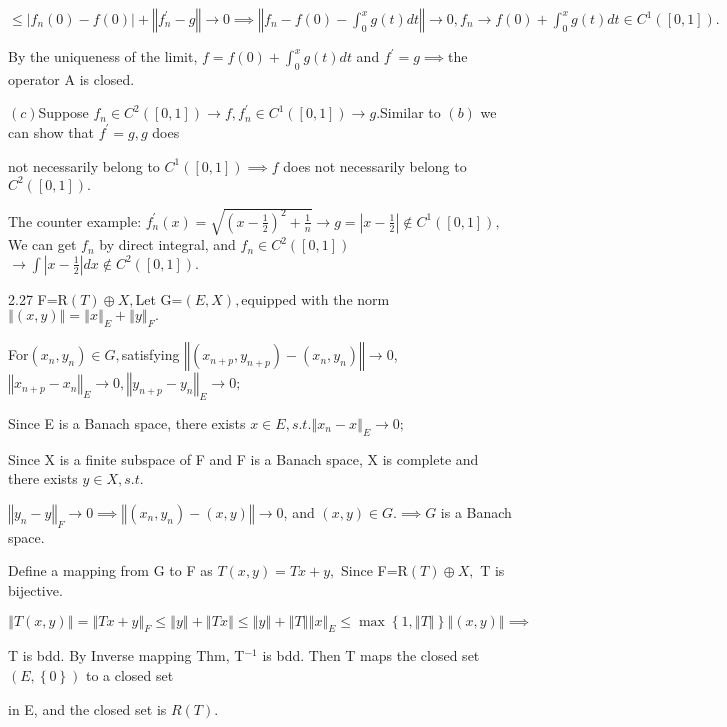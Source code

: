 \documentclass{article}
\begin{document}
$\leq \left\vert f_{n}\left( 0\right) -f\left( 0\right) \right\vert
+\left\Vert f_{n}^{\prime }-g\right\Vert \rightarrow 0\implies \left\Vert
f_{n}-f\left( 0\right) -\int_{0}^{x}g\left( t\right) dt\right\Vert
\rightarrow 0,f_{n}\rightarrow f\left( 0\right) +\int_{0}^{x}g\left(
t\right) dt\in C^{1}\left( \left[ 0,1\right] \right) .$

By the uniqueness of the limit, $f=f\left( 0\right) +\int_{0}^{x}g\left(
t\right) dt$ and $f^{\prime }=g\implies $the operator A is closed.

$\left( c\right) $Suppose $f_{n}\in C^{2}\left( \left[ 0,1\right] \right)
\rightarrow f,f_{n}^{\prime }\in C^{1}\left( \left[ 0,1\right] \right)
\rightarrow g.$Similar to $\left( b\right) $ we can show that $f^{\prime
}=g,g$ does 

not necessarily belong to $C^{1}\left( \left[ 0,1\right] \right) \implies f$
does not necessarily belong to $C^{2}\left( \left[ 0,1\right] \right) .$

The counter example: $f_{n}^{\prime }\left( x\right) =\sqrt{\left( x-\frac{1%
}{2}\right) ^{2}+\frac{1}{n}}\rightarrow g=\left\vert x-\frac{1}{2}%
\right\vert \notin C^{1}\left( \left[ 0,1\right] \right) ,$We can get $f_{n}$
by direct integral, and $f_{n}\in C^{2}\left( \left[ 0,1\right] \right) $ $%
\rightarrow \int \left\vert x-\frac{1}{2}\right\vert dx\notin C^{2}\left( %
\left[ 0,1\right] \right) .$

2.27 F=R$\left( T\right) \oplus X,$Let G=$\left( E,X\right) ,$equipped with
the norm $\left\Vert \left( x,y\right) \right\Vert =\left\Vert x\right\Vert
_{E}+\left\Vert y\right\Vert _{F}.$

For$\left( x_{n},y_{n}\right) \in G,$satisfying $\left\Vert \left(
x_{n+p},y_{n+p}\right) -\left( x_{n},y_{n}\right) \right\Vert \rightarrow 0$,%
$\left\Vert x_{n+p}-x_{n}\right\Vert _{E}\rightarrow 0,\left\Vert
y_{n+p}-y_{n}\right\Vert _{E}\rightarrow 0;$

Since E is a Banach space, there exists $x\in E,s.t.\left\Vert
x_{n}-x\right\Vert _{E}\rightarrow 0;$

Since X is a finite subspace of F and F is a Banach space, X is complete and
there exists $y\in X,s.t.$

$\left\Vert y_{n}-y\right\Vert _{F}\rightarrow 0\implies \left\Vert \left(
x_{n},y_{n}\right) -\left( x,y\right) \right\Vert \rightarrow 0$, and $%
\left( x,y\right) \in G.\implies G$ is a Banach space.

Define a mapping from G to F as $T\left( x,y\right) =Tx+y,$ Since F=R$\left(
T\right) \oplus X,$ T is bijective.

$\left\Vert T\left( x,y\right) \right\Vert =\left\Vert Tx+y\right\Vert
_{F}\leq \left\Vert y\right\Vert +\left\Vert Tx\right\Vert \leq \left\Vert
y\right\Vert +\left\Vert T\right\Vert \left\Vert x\right\Vert _{E}\leq \max
\left\{ 1,\left\Vert T\right\Vert \right\} \left\Vert \left( x,y\right)
\right\Vert \implies $

T is bdd. By Inverse mapping Thm, T$^{-1}$ is bdd. Then T maps the closed
set $\left( E,\left\{ 0\right\} \right) $ to a closed set

in E, and the closed set is $R\left( T\right) .$
\end{document}
